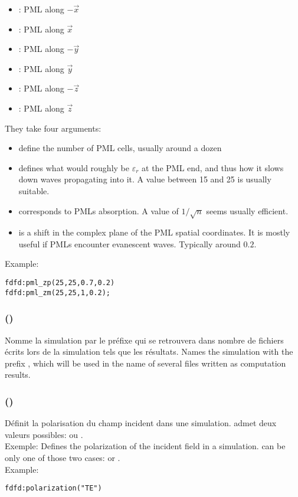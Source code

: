 {	\begin{itemize}
		\item {}: PML along $-\vec x$
		\item {}: PML along $\vec x$
		\item {}: PML along $-\vec y$
		\item {}: PML along $\vec y$
		\item {}: PML along $-\vec z$
		\item {}: PML along $\vec z$
	\end{itemize}
	They take four arguments:
	\begin{itemize}
		\item {} define the number of PML cells, usually around a dozen
		\item {} defines what would roughly be $\varepsilon_r$ at the PML end, and thus how it slows down waves propagating into it. A value between 15 and 25 is usually suitable.
		\item {} corresponds to PMLs absorption. A value of $1/\sqrt{n}$ seems usually efficient.
		\item {} is a shift in the complex plane of the PML spatial coordinates. It is mostly useful if PMLs encounter evanescent waves. Typically around $0.2$.
	\end{itemize}
	Example:
}
\begin{lstlisting}
fdfd:pml_zp(25,25,0.7,0.2)
fdfd:pml_zm(25,25,1,0.2);
\end{lstlisting}

\subsubsection[prefix]{()}

\langswitch
{
	Nomme la simulation par le préfixe  qui se retrouvera dans nombre de fichiers écrits lors de la simulation tels que les résultats.
}{
	Names the simulation with the prefix , which will be used in the name of several files written as computation results.
}

\subsubsection[polarization]{()}

\langswitch
{
	Définit la polarisation du champ incident dans une simulation.  admet deux valeurs possibles:  ou .\\ Exemple:
}{
	Defines the polarization of the incident field in a simulation.  can be only one of those two cases:  or .\\ Example:
}
\begin{lstlisting}
fdfd:polarization("TE")
\end{lstlisting}

